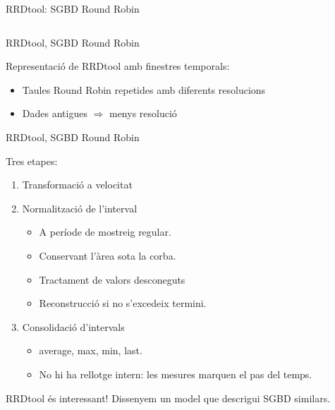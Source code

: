 \begin{frame}{RRDtool: SGBD Round Robin}
\begin{columns}
\end{columns}


\end{frame}



\begin{frame}{RRDtool, SGBD Round Robin}


Representació de RRDtool amb finestres temporals:
  \begin{itemize}
    \item Taules Round Robin repetides amb diferents resolucions
    \item Dades antigues $\Longrightarrow$ menys resolució
  \end{itemize}
\vspace{-1mm}




\end{frame}




\begin{frame}{RRDtool, SGBD Round Robin}

Tres etapes: \smallskip
\begin{enumerate}
\item Transformació a velocitat \smallskip

\item Normalització de l'interval 
\begin{itemize}
\item A període de mostreig regular.
\item Conservant l'àrea sota la corba.
\item Tractament de valors desconeguts
\item Reconstrucció si no s'excedeix termini.
\end{itemize}\smallskip

\item Consolidació d'intervals
\begin{itemize}
\item average, max, min, last.
\item No hi ha rellotge intern: les mesures marquen el pas del temps.
\end{itemize}

\end{enumerate}

\bigskip

RRDtool és interessant! Dissenyem un model que descrigui SGBD similars.


\end{frame}




